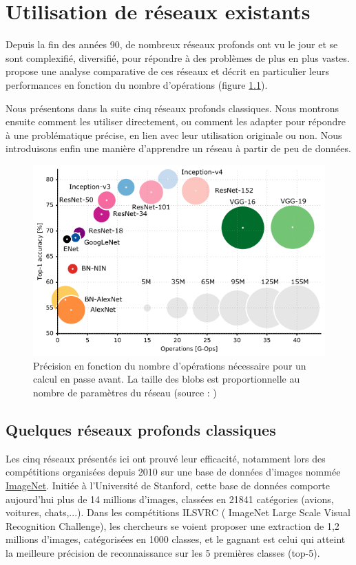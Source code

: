 \documentclass{DocBleu}
\begin{document}
\chapter{Utilisation de réseaux existants}
\PartialToC
Depuis la fin des années 90, de nombreux réseaux profonds ont vu le jour et se sont complexifié, diversifié, pour répondre à des problèmes de plus en plus vastes. \cite{Canziani16} propose une analyse comparative de ces réseaux et décrit en particulier leurs performances en fonction du nombre d'opérations (figure \ref{F:compar}).

Nous présentons dans la suite cinq réseaux profonds classiques. Nous montrons ensuite comment les utiliser directement, ou comment les adapter pour répondre à une problématique précise, en lien avec leur utilisation originale ou non. Nous introduisons enfin une  manière d'apprendre  un réseau à partir de  peu  de données.

\begin{figure}[hbtp!]
\centering
\includegraphics[scale=.7]{images/comparaison.png}
\caption{Précision en fonction du nombre d'opérations nécessaire pour un calcul en passe avant. La taille des blobs est proportionnelle au nombre de paramètres du réseau (source : \cite{Canziani16})}
\label{F:compar}
\end{figure}

\section{Quelques réseaux profonds classiques}

Les cinq réseaux présentés ici ont prouvé leur efficacité, notamment lors des compétitions organisées depuis 2010 sur une base de données d'images nommée \href{http://www.image-net.org/}{ImageNet}. Initiée à l'Université de Stanford, cette base de données comporte aujourd'hui plus de 14 millions d'images, classées en 21841 catégories (avions, voitures, chats,...). Dans les compétitions ILSVRC ( ImageNet Large Scale Visual Recognition Challenge), les chercheurs se voient proposer une extraction de 1,2 millions d'images, catégorisées en 1000 classes, et le gagnant est celui qui atteint la meilleure précision de reconnaissance sur les 5 premières classes (top-5). \\
\end{document}
